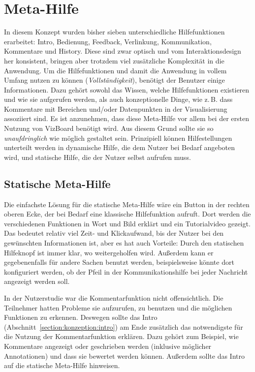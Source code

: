 \documentclass[
	headsepline,
	footsepline,
	fontsize=12pt,
	bibliography=totoc
]{scrbook}
\begin{document}
\section{Meta-Hilfe}
\label{section:konzeption:meta-hilfe}


In diesem Konzept wurden bisher sieben unterschiedliche Hilfefunktionen erarbeitet: Intro, Bedienung, Feedback, Verlinkung, Kommunikation, Kommentare und History. Diese sind zwar optisch und vom Interaktionsdesign her konsistent, bringen aber trotzdem viel zusätzliche Komplexität in die Anwendung. Um die Hilfefunktionen und damit die Anwendung in vollem Umfang nutzen zu können (\emph{Vollständigkeit}), benötigt der Benutzer einige Informationen. Dazu gehört sowohl das Wissen, welche Hilfefunktionen existieren und wie sie aufgerufen werden, als auch konzeptionelle Dinge, wie z.\,B. dass Kommentare mit Bereichen und/oder Datenpunkten in der Visualisierung assoziiert sind. Es ist anzunehmen, dass diese Meta-Hilfe vor allem bei der ersten Nutzung von VizBoard benötigt wird. Aus diesem Grund sollte sie so \emph{unaufdringlich} wie möglich gestaltet sein. Prinzipiell können Hilfestellungen unterteilt werden in dynamische Hilfe, die dem Nutzer bei Bedarf angeboten wird, und statische Hilfe, die der Nutzer selbst aufrufen muss.

\subsection{Statische Meta-Hilfe}


Die einfachste Lösung für die statische Meta-Hilfe wäre ein Button in der rechten oberen Ecke, der bei Bedarf eine klassische Hilfefunktion aufruft. Dort werden die verschiedenen Funktionen in Wort und Bild erklärt und ein Tutorialvideo gezeigt. Das bedeutet relativ viel Zeit- und Klickaufwand, bis der Nutzer bei den gewünschten Informationen ist, aber es hat auch Vorteile: Durch den statischen Hilfeknopf ist immer klar, wo weitergeholfen wird. Außerdem kann er gegebenenfalls für andere Sachen benutzt werden, beispielsweise könnte dort konfiguriert werden, ob der Pfeil in der Kommunikationshilfe bei jeder Nachricht angezeigt werden soll.

In der Nutzerstudie war die Kommentarfunktion nicht offensichtlich. Die Teilnehmer hatten Probleme sie aufzurufen, zu benutzen und die möglichen Funktionen zu erkennen. Deswegen sollte das Intro (Abschnitt~\ref{section:konzeption:intro}) am Ende zusätzlich das notwendigste für die Nutzung der Kommentarfunktion erklären. Dazu gehört zum Beispiel, wie Kommentare angezeigt oder geschrieben werden (inklusive möglicher Annotationen) und dass sie bewertet werden können. Außerdem sollte das Intro auf die statische Meta-Hilfe hinweisen.
\end{document}
